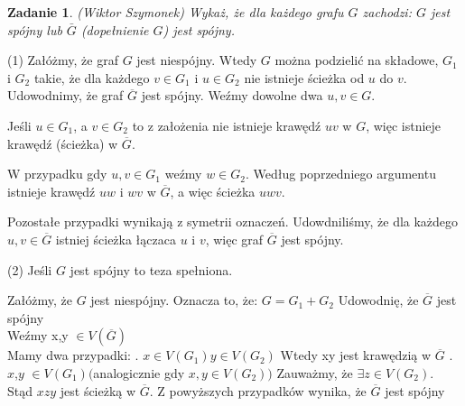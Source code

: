\documentclass{mwart}
\newtheorem{zad}{Zadanie}[section]
\begin{document}
\begin{zad} (Wiktor Szymonek)
    Wykaż, że dla każdego grafu $G$ zachodzi: $G$ jest spójny lub $\bar{G}$ (dopełnienie $G$) jest spójny.
\end{zad}
\begin{mdframed}

     (1) Załóżmy, że graf $G$ jest niespójny. Wtedy $G$ można podzielić na 
     składowe, $G_1$ i $G_2$ takie, że dla każdego $v \in G_1$ i $u \in G_2$ 
     nie istnieje ścieżka od $u$ do $v$. Udowodnimy, że graf $\overline{G}$ jest 
     spójny. Weźmy dowolne dwa $u, v \in G$. 
     
         Jeśli $u \in G_1$, a $v \in G_2$ to 
     z założenia nie istnieje krawędź $uv$ w $G$, więc istnieje krawędź (ścieżka) w 
     $\overline{G}$. 
     
         W przypadku gdy $u, v \in G_1$ weźmy $w \in G_2$. Według poprzedniego 
     argumentu istnieje krawędź $uw$ i $wv$ w $\overline{G}$, a więc ścieżka $uwv$. 
     
         Pozostałe przypadki wynikają z symetrii oznaczeń. Udowdniliśmy, że dla każdego 
     $u, v \in \overline{G}$ istniej ścieżka łączaca $u$ i $v$, więc graf $\overline{G}$ 
     jest spójny.
 
     (2) Jeśli $G$ jest spójny to teza spełniona.
\end{mdframed}
\begin{mdframed}
    Załóżmy, że $G$ jest niespójny.
    Oznacza to, że:
    $G = G_1 + G_2$
    \newline
    Udowodnię, że $\overline{G}$ jest spójny \\

    Weźmy x,y $\in V(\overline{G}) $\\
    Mamy dwa przypadki:
    . $x \in V(G_1)  y \in V(G_2)$
    \newline
    Wtedy xy jest krawędzią w $\overline{G}$
    \newline{}. $x$,$y$ $\in V(G_1) ($analogicznie gdy $ x,y \in V(G_2))$
    Zauważmy, że \( \exists z \in V(G_2) \).\\
Stąd \( xzy \) jest ścieżką w \( \overline{G} \).
\newline\newline
Z powyższych przypadków wynika, że $\overline{G}$ jest spójny
\end{mdframed}
\end{document}
